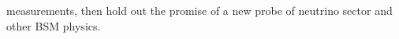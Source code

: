 measurements, then hold out the promise of a new probe of neutrino sector and other BSM physics.






